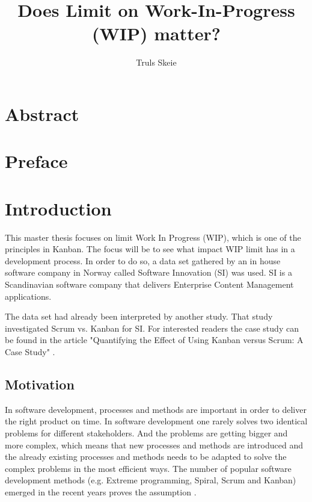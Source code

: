 \documentclass[UKenglish]{ifimaster}  %
\title{Does Limit on Work-In-Progress (WIP) matter?}        %
\author{Truls Skeie}                      %
\begin{document}
\ififorside{}
\frontmatter{}
\maketitle{}

\chapter*{Abstract}                   %

\tableofcontents{}
\listoffigures{}
\listoftables{}
\lstlistoflistings{}

\chapter*{Preface}                    %

\mainmatter{}
\chapter{Introduction}
\label{chap:intro}
This master thesis focuses on limit Work In Progress (WIP), which is one of the principles in Kanban. The focus will be to see what impact WIP limit has in a development process. In order to do so, a data set gathered by an in house software company in Norway called Software Innovation (SI) was used. SI is a Scandinavian software company that delivers Enterprise Content Management applications.

The data set had already been interpreted by another study. That study investigated Scrum vs. Kanban for SI. For interested readers the case study can be found in the article "Quantifying the Effect of Using Kanban versus Scrum: A Case Study" \parencite{Dag}. 

\section{Motivation}
In software development, processes and methods are important in order to deliver the right product on time. In software development one rarely solves two identical problems for different stakeholders. And the problems are getting bigger and more complex, which means that new processes and methods are introduced and the already existing processes and methods needs to be adapted to solve the complex problems in the most efficient ways.  The number of popular software development methods  (e.g. Extreme programming, Spiral, Scrum and Kanban) emerged in the recent years proves the assumption \parencite{gandomani2013important} \parencite{ikonen2010exploring}.
\end{document}

